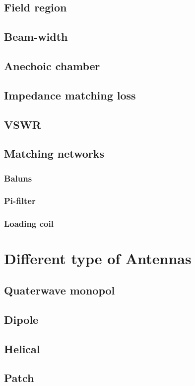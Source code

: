 \subsection{Field region}
\subsection{Beam-width}
\subsection{Anechoic chamber}

\subsection{Impedance matching loss}
\subsection{VSWR}
\subsection{Matching networks}
\subsubsection{Baluns}
\subsubsection{Pi-filter}
\subsubsection{Loading coil}
\section{Different type of Antennas}
\subsection{Quaterwave monopol}
\subsection{Dipole}
\subsection{Helical}
\subsection{Patch}
